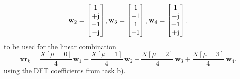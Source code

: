 \documentclass[11pt,a4paper,DIV=12]{scrartcl}
\begin{document}
\begin{Loesung}
\begin{enumerate}[label=\alph*)]
\begin{align}
	\mathbf{w}_2 = \begin{bmatrix}1\\+\im\\-1\\-\im\end{bmatrix},
	\mathbf{w}_3 = \begin{bmatrix}1\\-1\\1\\-1\end{bmatrix},
	\mathbf{w}_4 = \begin{bmatrix}1\\-\im\\-1\\+\im\end{bmatrix}.
	\end{align}
  to be used for the linear combination
	\begin{equation}
	\mathbf{xr}_k =
  \frac{X[\mu=0]}{4} \, \mathbf{w}_1
	+ \frac{X[\mu=1]}{4} \,\mathbf{w}_2
	+ \frac{X[\mu=2]}{4} \,\mathbf{w}_3
	+ \frac{X[\mu=3]}{4} \,\mathbf{w}_4.
	\end{equation}
  using the DFT coefficients from task b).


\end{enumerate}
\end{Loesung}
\end{document}
